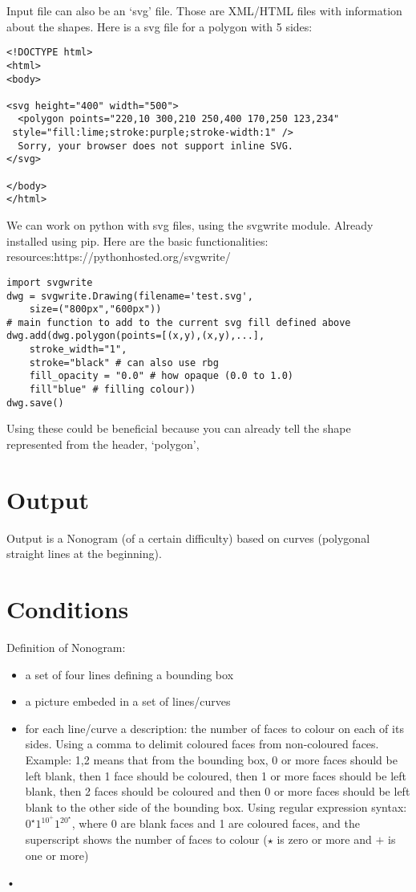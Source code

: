 \documentclass{article}
\begin{document}
Input file can also be an `svg' file. Those are XML/HTML files with information about the shapes. Here is a svg file for a polygon with 5 sides:
\begin{verbatim}
<!DOCTYPE html>
<html>
<body>

<svg height="400" width="500">
  <polygon points="220,10 300,210 250,400 170,250 123,234"
 style="fill:lime;stroke:purple;stroke-width:1" />
  Sorry, your browser does not support inline SVG.
</svg>

</body>
</html>
\end{verbatim}

We can work on python with svg files, using the svgwrite module. Already installed using pip. Here are the basic functionalities:\\

resources:{https://pythonhosted.org/svgwrite/}

\begin{verbatim}
import svgwrite
dwg = svgwrite.Drawing(filename='test.svg',
	size=("800px","600px"))
# main function to add to the current svg fill defined above
dwg.add(dwg.polygon(points=[(x,y),(x,y),...],
	stroke_width="1",
	stroke="black" # can also use rbg
	fill_opacity = "0.0" # how opaque (0.0 to 1.0)
	fill"blue" # filling colour))
dwg.save()
\end{verbatim}

Using these could be beneficial because you can already tell the shape represented from the header, `polygon', 




\section{Output}

Output is a Nonogram (of a certain difficulty) based on curves (polygonal straight lines at the beginning). 


\section{Conditions}
Definition of Nonogram:
\begin{itemize}
\item a set of four lines defining a bounding box
\item a picture embeded in a set of lines/curves
\item for each line/curve a description: the number of faces to colour on each of its sides. Using a comma to delimit coloured faces from non-coloured faces. Example: 1,2 means that from the bounding box, 0 or more faces should be left blank, then 1 face should be coloured, then 1 or more faces should be left blank, then 2 faces should be coloured and then 0 or more faces should be left blank to the other side of the bounding box. Using regular expression syntax: $0^\star1^10^+1^20^\star$, where 0 are blank faces and 1 are coloured faces, and the superscript shows the number of faces to colour ($\star$ is zero or more and $+$ is one or more)

\end{itemize}•
\end{document}
